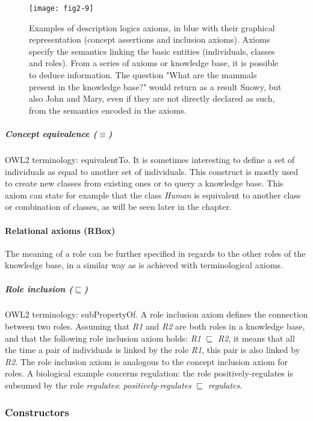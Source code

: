\begin{figure}[ht]
    \centering
    \texttt{[image: fig2-9]}
    \caption{Examples of description logics axioms, in blue with their graphical representation (concept assertions and inclusion axioms). Axioms specify the semantics linking the basic entities (individuals, classes and roles). From a series of axioms or knowledge base, it is possible to deduce information. The question "What are the mammals present in the knowledge base?" would return as a result Snowy, but also John and Mary, even if they are not directly declared as such, from the semantics encoded in the axioms.}
    \label{fig2-9}
\end{figure}

\subparagraph{Concept equivalence ($ \equiv $)\\}
OWL2 terminology: equivalentTo. It is sometimes interesting to define a set of individuals as equal to another set of individuals. This construct is mostly used to create new classes from existing ones or to query a knowledge base. This axiom can state for example that the class \emph{Human} is equivalent to another class or combination of classes, as will be seen later in the chapter.

\paragraph{\textbf{Relational axioms (RBox)}\\}

The meaning of a role can be further specified in regards to the other roles of the knowledge base, in a similar way as is achieved with terminological axioms.

\subparagraph{Role inclusion ($ \sqsubseteq $)\\}
OWL2 terminology: subPropertyOf. A role inclusion axiom defines the connection between two roles. Assuming that \emph{R1} and \emph{R2} are both roles in a knowledge base, and that the following role inclusion axiom holds: \emph{R1} $ \sqsubseteq $ \emph{R2}, it means that all the time a pair of individuals is linked by the role \emph{R1}, this pair is also linked by \emph{R2}. The role inclusion axiom is analogous to the concept inclusion axiom for roles. A biological example concerns regulation: the role positively-regulates is subsumed by the role \emph{regulates}: \emph{positively-regulates} $ \sqsubseteq $ \emph{regulates}.

\subsubsection{Constructors}

